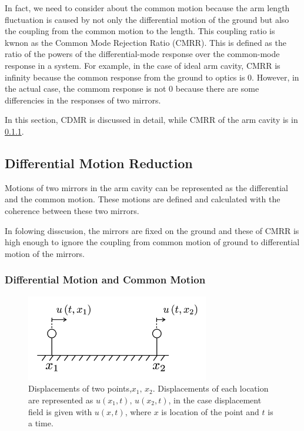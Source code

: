 \documentclass[a4paper,12pt]{book}
\begin{document}
In fact, we need to consider about the common motion because the arm length fluctuation is caused by not only the differential motion of the ground but also the coupling from the common motion to the length. This coupling ratio is kwnon as the Common Mode Rejection Ratio (CMRR). This is defined as the ratio of the powers of the differential-mode response over the common-mode response in a system. For example, in the case of ideal arm cavity, CMRR is infinity because the common response from the ground to optics is 0. However, in the actual case, the commom response is not 0 because there are some differencies in the responses of two mirrors. 

In this section, CDMR is discussed in detail, while CMRR of the arm cavity is in \ref{}.


\subsection{Differential Motion Reduction}
Motions of two mirrors in the arm cavity can be represented as the differential and the common motion. These motions are defined and calculated with the coherence between these two mirrors. 

In folowing disscusion, the mirrors are fixed on the ground and these of CMRR is high enough to ignore the coupling from common motion of ground to differential motion of the mirrors.

\subsubsection{Differential Motion and Common Motion}
\begin{figure}[H]
  \begin{center}
    \includegraphics[width=8.0cm]{./img_cdmr_arm.png}
  \end{center}
  \caption{Displacements of two points,$x_1,\,x_2$. Displacements of each location are represented as $u(x_1,t),\, u(x_2,t)$, in the case displacement field is given with $u(x,t)$, where $x$ is location of the point and $t$ is a time.
  }\label{img:img_diffcomm}  
\end{figure}
\end{document}
